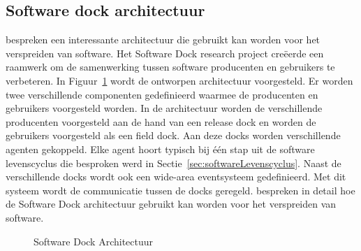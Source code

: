 \subsection{Software dock architectuur}\label{sec:softwareDock}
\citet{hall1999cooperative} bespreken een interessante architectuur die gebruikt kan worden voor het verspreiden van software.
Het Software Dock research project creëerde een raamwerk om de samenwerking tussen software producenten en gebruikers te verbeteren.
In Figuur~\ref{fig:softwareDock} wordt de ontworpen architectuur voorgesteld.
Er worden twee verschillende componenten gedefinieerd waarmee de producenten en gebruikers voorgesteld worden.
In de architectuur worden de verschillende producenten voorgesteld aan de hand van een release dock en worden de gebruikers voorgesteld als een field dock.
Aan deze docks worden verschillende agenten gekoppeld.
Elke agent hoort typisch bij één stap uit de software levenscyclus die besproken werd in Sectie~\ref{sec:softwareLevenscyclus}.
Naast de verschillende docks wordt ook een wide-area eventsysteem gedefinieerd.
Met dit systeem wordt de communicatie tussen de docks geregeld.
\citet{hall1997architecture} bespreken in detail hoe de Software Dock architectuur gebruikt kan worden voor het verspreiden van software.

\begin{figure}[!ht]
\centering
{}
\caption{Software Dock Architectuur \citep{hall1999cooperative}}
\label{fig:softwareDock}
\end{figure}

